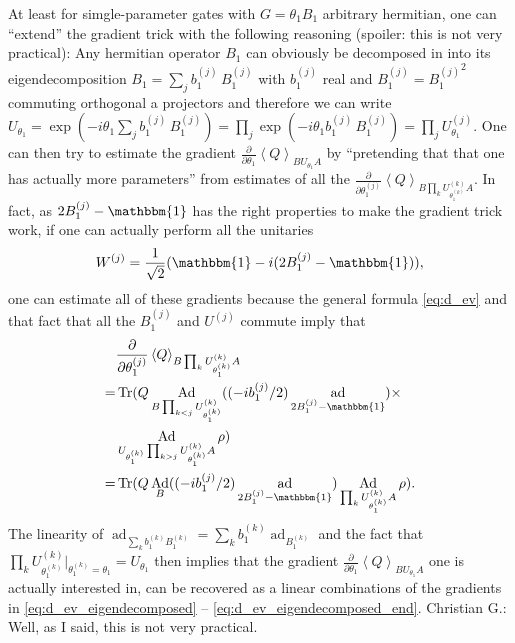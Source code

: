 \documentclass[aps,pra,10pt,twocolumn,groupedaddress,nofootinbib]{revtex4-1}
\theoremstyle{plain}
\DeclareMathOperator{\tr}{Tr}
\DeclareMathOperator{\Ad}{Ad}
\DeclareMathOperator{\ad}{ad}
\newcommand{\pd}[2]{\frac{\partial #1}{\partial #2}}  %
\newcommand{\I}{\mathbbm{1}} %
\newcommand{\expect}[1]{\ensuremath{\left\langle #1 \right\rangle}} %
\newcommand{\cg}[1]{\textcolor{cyan!80!black}{Christian G.: #1}}
\begin{document}
At least for simgle-parameter gates with $G = \theta_1 B_1$ arbitrary hermitian, one can ``extend'' the gradient trick with the following reasoning (spoiler: this is not very practical):
Any hermitian operator $B_1$ can obviously be decomposed in into its eigendecomposition $B_1 = \sum_j b_1^{(j)} \, B_1^{(j)}$ with $b_1^{(j)}$ real and $B_1^{(j)} = {B_1^{(j)}}^2$ commuting orthogonal a projectors and therefore we can write $U_{\theta_1} = \exp(-i \theta_1 \sum_j b_1^{(j)} \, B_1^{(j)}) = \prod_j \exp(-i \theta_1 b_1^{(j)} \, B_1^{(j)}) = \prod_j U^{(j)}_{\theta_1}$.
One can then try to estimate the gradient $\pd{}{\theta_1} \expect{Q}_{B U_{\theta_1} A}$ by ``pretending that that one has actually more parameters'' from estimates of all the $\pd{}{\theta_1^{(j)}} \expect{Q}_{B \prod_k U^{(k)}_{\theta_1^{(k)}} A}$.
In fact, as $2 B_1^{(j)} - \I$ has the right properties to make the gradient trick work, if one can actually perform all the unitaries
\begin{equation}
  W^{(j)} = \frac{1}{\sqrt{2}}(\I - i (2 B_1^{(j)} - \I)) ,
\end{equation}
one can estimate all of these gradients because the general formula \eqref{eq:d_ev} and that fact that all the $B_1^{(j)}$ and $U^{(j)}$ commute imply that
\begin{align}
    \label{eq:d_ev_eigendecomposed}
  &\pd{}{\theta_1^{(j)}} \expect{Q}_{B \prod_k U^{(k)}_{\theta_1^{(k)}}  A} \\
  = &\tr(Q \Ad_{B \prod_{k<j} U^{(k)}_{\theta_1^{(k)}}} ((-i b_1^{(j)}/2) \ad_{2 B_1^{(j)} - \I}) \times\\ &\Ad_{U_{\theta_1^{(k)}} \prod_{k>j} U^{(k)}_{\theta_1^{(k)}} A} \rho)\\
  = &\tr(Q \Ad_B ((-i b_1^{(j)}/2) \ad_{2 B_1^{(j)} - \I}) \Ad_{\prod_{k} U^{(k)}_{\theta_1^{(k)}} A} \rho).     \label{eq:d_ev_eigendecomposed_end}
\end{align}
The linearity of $\ad_{\sum_k b_1^{(k)} B_1^{(k)}} = \sum_k b_1^{(k)} \ad_{B_1^{(k)}}$ and the fact that $\prod_{k} U^{(k)}_{\theta_1^{(k)}} \big|_{\theta_1^{(k)} = \theta_1} = U_{\theta_1}$ then implies that the gradient $\pd{}{\theta_1} \expect{Q}_{B U_{\theta_1} A}$ one is actually interested in, can be recovered as a linear combinations of the gradients in \eqref{eq:d_ev_eigendecomposed} -- \eqref{eq:d_ev_eigendecomposed_end}.
\cg{Well, as I said, this is not very practical.}
\end{document}
